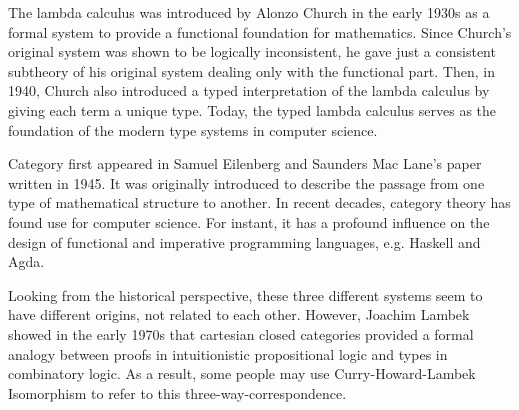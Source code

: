 The lambda calculus was introduced by Alonzo Church in the early 1930s as a formal system to provide a functional foundation for mathematics. Since Church’s original system was shown to be logically inconsistent, he gave just a consistent subtheory of his original system dealing only with the functional part. Then, in 1940, Church also introduced a typed interpretation of the lambda calculus by giving each term a unique type. Today, the typed lambda calculus serves as the foundation of the modern type systems in computer science.

Category first appeared in Samuel Eilenberg and Saunders Mac Lane’s paper written in 1945. It was originally introduced to describe the passage from one type of mathematical structure to another. In recent decades, category theory has found use for computer science. For instant, it has a profound influence on the design of functional and imperative programming languages, e.g. Haskell and Agda.

Looking from the historical perspective, these three different systems seem to have different origins, not related to each other. However, Joachim Lambek showed in the early 1970s that cartesian closed categories provided a formal analogy between proofs in intuitionistic propositional logic and types in combinatory logic. As a result, some people may use Curry-Howard-Lambek Isomorphism to refer to this three-way-correspondence.